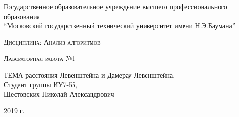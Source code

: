 \documentclass[a4paper, 14pt]{article}
\begin{document}
    \begin{titlepage}

        \begin{center}
            \large
            Государственное образовательное учреждение высшего профессионального образования\\
            “Московский государственный технический университет имени Н.Э.Баумана”
            \vspace{3cm}
            
            \textsc{Дисциплина: Анализ алгоритмов}
            \vspace{0.5cm}
                
            \textsc{Лабораторная работа №1}
            \vspace{1.5cm}
            
            {\LARGE ТЕМА-расстояния Левенштейна и Дамерау-Левенштейна.\\}
            \vspace{1.5cm}
            Студент группы ИУ7-55,\\   
            Шестовских Николай Александрович
            \vfill
            
            2019 г.
            
            \end{center}

    \end{titlepage}
\tableofcontents
	
	\newpage
	
\end{document}
